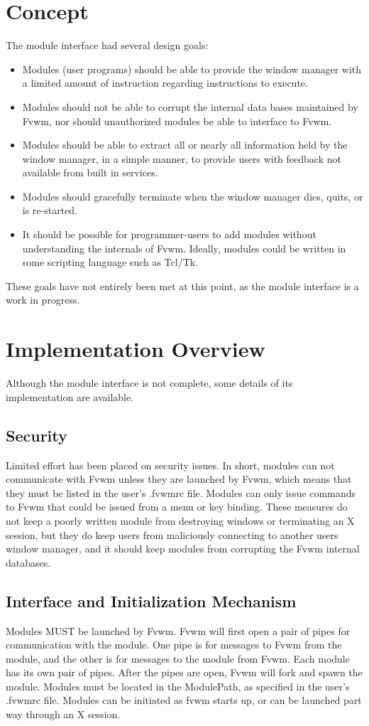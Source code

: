 \section{Concept}
The module interface had several design goals:
\begin{itemize}
\item{Modules (user programs) should be able to provide the window
manager with a limited amount of instruction regarding instructions to
execute.}
\item{Modules should not be able to corrupt the internal data bases
maintained by Fvwm, nor should unauthorized modules be able to
interface to Fvwm.}
\item{Modules should be able to extract all or nearly all information
held by the window manager, in a simple manner, to provide users with
feedback not available from built in services.}
\item{Modules should gracefully terminate when the window manager
dies, quits, or is re-started.}
\item{It should be possible for programmer-users to add modules
without understanding the internals of Fvwm. Ideally, modules could be
written in some scripting language such as Tcl/Tk.}
\end{itemize}
These goals have not entirely been met at this point, as the module
interface is a work in progress. 

\section{Implementation Overview}
Although the module interface is not complete, some details of its
implementation are available.
\subsection{Security}
Limited effort has been placed on security issues. In short, modules
can not communicate with Fvwm unless they are launched by Fvwm, which
means that they must be listed in the user's .fvwmrc file.
Modules can only issue commands to Fvwm that could be issued from a
menu or key binding. These measures do not keep a poorly written
module from destroying windows or terminating an X session, but they
do keep users from maliciously connecting to another users window
manager, and it should keep modules from corrupting the Fvwm internal 
databases.
\subsection{Interface and Initialization Mechanism}
Modules MUST be launched by Fvwm. Fvwm will first open a pair of pipes
for communication with the module. One pipe is for messages to Fvwm
from the module, and the other is for messages to the module from
Fvwm. Each module has its own pair of pipes. After the pipes are open,
Fvwm will fork and spawn the module. Modules must be located in the
ModulePath, as specified in the user's .fvwmrc file. Modules can be
initiated as fvwm starts up, or can be launched part way through an X
session.

